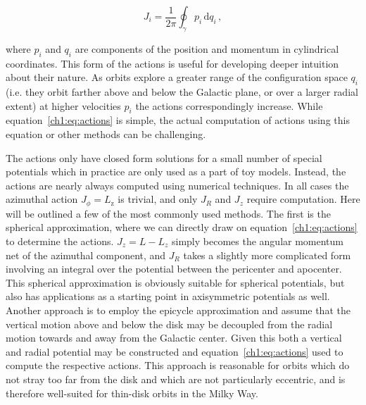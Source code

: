 \begin{equation}
    \label{ch1:eq:actions}
    J_{i} = \frac{1}{2\pi}\oint_{\gamma} p_{i}\, \mathrm{d}q_{i}\,,
\end{equation}

\noindent where $p_{i}$ and $q_{i}$ are components of the position and momentum in cylindrical coordinates. This form of the actions is useful for developing deeper intuition about their nature. As orbits explore a greater range of the configuration space $q_{i}$ (i.e. they orbit farther above and below the Galactic plane, or over a larger radial extent) at higher velocities $p_{i}$ the actions correspondingly increase. While equation~\eqref{ch1:eq:actions} is simple, the actual computation of actions using this equation or other methods can be challenging.

The actions only have closed form solutions for a small number of special potentials \parencite[again the potential of ][ for example]{henon59a} which in practice are only used as a part of toy models. Instead, the actions are nearly always computed using numerical techniques. In all cases the azimuthal action $J_{\phi} = L_\mathrm{z}$ is trivial, and only $J_{R}$ and $J_{z}$ require computation. Here will be outlined a few of the most commonly used methods. The first is the spherical approximation, where we can directly draw on equation~\ref{ch1:eq:actions} to determine the actions. $J_{z} = L - L_{z}$ simply becomes the angular momentum net of the azimuthal component, and $J_{R}$ takes a slightly more complicated form involving an integral over the potential between the pericenter and apocenter. This spherical approximation is obviously suitable for spherical potentials, but also has applications as a starting point in axisymmetric potentials as well. Another approach is to employ the epicycle approximation and assume that the vertical motion above and below the disk may be decoupled from the radial motion towards and away from the Galactic center. Given this both a vertical and radial potential may be constructed and equation~\ref{ch1:eq:actions} used to compute the respective actions. This approach is reasonable for orbits which do not stray too far from the disk and which are not particularly eccentric, and is therefore well-suited for thin-disk orbits in the Milky Way.


